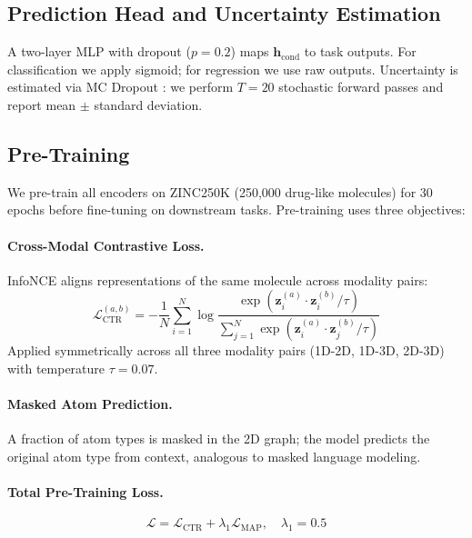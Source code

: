 \documentclass[11pt]{article}
\begin{document}
\subsection{Prediction Head and Uncertainty Estimation}

A two-layer MLP with dropout ($p=0.2$) maps $\mathbf{h}_{\text{cond}}$ to task outputs. For classification we apply sigmoid; for regression we use raw outputs. Uncertainty is estimated via MC Dropout \citep{gal2016dropout}: we perform $T=20$ stochastic forward passes and report mean $\pm$ standard deviation.

\subsection{Pre-Training}
\label{sec:pretraining}

We pre-train all encoders on ZINC250K \citep{sterling2015zinc} (250,000 drug-like molecules) for 30 epochs before fine-tuning on downstream tasks. Pre-training uses three objectives:

\paragraph{Cross-Modal Contrastive Loss.}
InfoNCE \citep{oord2018representation} aligns representations of the same molecule across modality pairs:
\begin{equation}
    \mathcal{L}_{\text{CTR}}^{(a,b)} = -\frac{1}{N}\sum_{i=1}^{N} \log \frac{\exp(\mathbf{z}_i^{(a)} \cdot \mathbf{z}_i^{(b)} / \tau)}{\sum_{j=1}^{N} \exp(\mathbf{z}_i^{(a)} \cdot \mathbf{z}_j^{(b)} / \tau)}
\end{equation}
Applied symmetrically across all three modality pairs (1D-2D, 1D-3D, 2D-3D) with temperature $\tau = 0.07$.

\paragraph{Masked Atom Prediction.}
A fraction of atom types is masked in the 2D graph; the model predicts the original atom type from context, analogous to masked language modeling.

\paragraph{Total Pre-Training Loss.}
\begin{equation}
    \mathcal{L} = \mathcal{L}_{\text{CTR}} + \lambda_1 \mathcal{L}_{\text{MAP}}, \quad \lambda_1 = 0.5
\end{equation}
\end{document}
